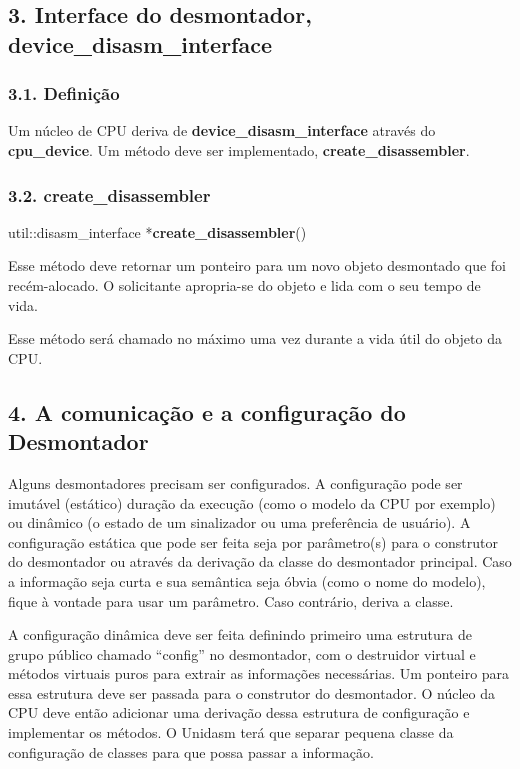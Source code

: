 \documentclass[letterpaper,10pt,brazil]{sphinxmanual}
\begin{document}
\subsection{3. Interface do desmontador, device\_disasm\_interface}
\label{techspecs/device_disasm_interface:interface-do-desmontador-device-disasm-interface}

\subsubsection{3.1. Definição}
\label{techspecs/device_disasm_interface:id1}
Um núcleo de CPU deriva de \textbf{device\_disasm\_interface} através do
\textbf{cpu\_device}. Um método deve ser implementado,
\textbf{create\_disassembler}.


\subsubsection{3.2. create\_disassembler}
\label{techspecs/device_disasm_interface:create-disassembler}
\begin{DUlineblock}{0em}
\item[] util::disasm\_interface *\textbf{create\_disassembler}()
\end{DUlineblock}

Esse método deve retornar um ponteiro para um novo objeto desmontado que
foi recém-alocado. O solicitante apropria-se do objeto e lida com o seu
tempo de vida.

Esse método será chamado no máximo uma vez durante a vida útil
do objeto da CPU.


\subsection{4. A comunicação e a configuração do Desmontador}
\label{techspecs/device_disasm_interface:a-comunicacao-e-a-configuracao-do-desmontador}
Alguns desmontadores precisam ser configurados. A configuração pode ser
imutável (estático) duração da execução (como o modelo da CPU por
exemplo) ou dinâmico (o estado de um sinalizador ou uma preferência de
usuário). A configuração estática que pode ser feita seja por parâmetro(s)
para o construtor do desmontador ou através da derivação da classe do
desmontador principal. Caso a informação seja curta e sua semântica seja
óbvia (como o nome do modelo), fique à vontade para usar um parâmetro.
Caso contrário, deriva a classe.

A configuração dinâmica deve ser feita definindo primeiro uma
estrutura de grupo público chamado ``config'' no desmontador,
com o destruidor virtual e métodos virtuais puros para extrair
as informações necessárias. Um ponteiro para essa estrutura deve ser
passada para o construtor do desmontador. O núcleo da CPU deve então
adicionar uma derivação dessa estrutura de configuração e implementar os
métodos. O Unidasm terá que separar pequena classe da configuração de
classes para que possa passar a informação.
\end{document}
